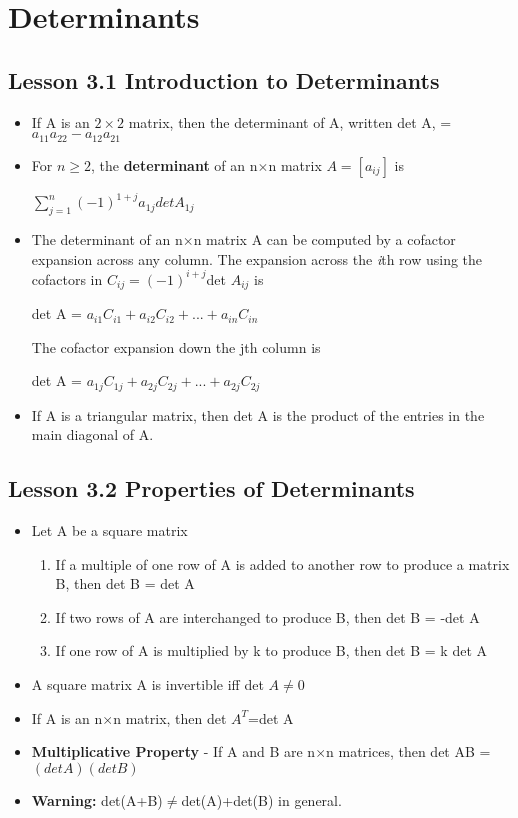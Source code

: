 \documentclass{report}
\newcommand{\nxn}{n$\times$n}
\begin{document}
\chapter{Determinants}
\section{Lesson 3.1 Introduction to Determinants}
	\begin{itemize}\addtolength{\leftskip}{2em}
		\item If A is an $2\times 2$ matrix, then the determinant of A, written det A, = $a_{11}a_{22}-a_{12}a_{21}$
		\item For $n \geq 2$, the \textbf{determinant} of an {\nxn} matrix $A=[a_{ij}]$ is 
		\begin{center}
		$\sum\limits_{j=1}^{n}(-1)^{1+j}a_{1j}det A_{1j}$
		\end{center} 
		\item The determinant of an {\nxn} matrix A can be computed by a cofactor expansion across any column. The expansion across the \textit{i}th row using the cofactors in $C_{ij}=(-1)^{i+j}$det $A_{ij}$  is 
		\begin{center}
		det A = $a_{i1}C_{i1}+a_{i2}C_{i2}+...+a_{in}C_{in}$
		\end{center}
		The cofactor expansion down the jth column is 
		\begin{center}
		det A = $a_{1j}C_{1j}+a_{2j}C_{2j}+...+a_{2j}C_{2j}$
		\end{center}
		\item If A is a triangular matrix, then det A is the product of the entries in the main diagonal of A.
	\end{itemize}
\section{Lesson 3.2 Properties of Determinants}
	\begin{itemize}\addtolength{\leftskip}{2em}
		\item Let A be a square matrix
		\begin{enumerate}\addtolength{\leftskip}{4em}
		\item If a multiple of one row of A is added to another row to produce a matrix B, then det B = det A 
		\item If two rows of A are interchanged to produce B, then det B = -det A
		\item If one row of A is multiplied by k to produce B, then det B = k det A
		\end{enumerate}
		\item A square matrix A is invertible iff det $A\ne 0$
		\item If A is an {\nxn} matrix, then det $A^T$=det A
		\item \textbf{Multiplicative Property} - If A and B are {\nxn} matrices, then det AB = $(det A)(det B)$
		\item \textbf{Warning:} det(A+B)$\ne$det(A)+det(B) in general.
	\end{itemize}
	
\end{document}
